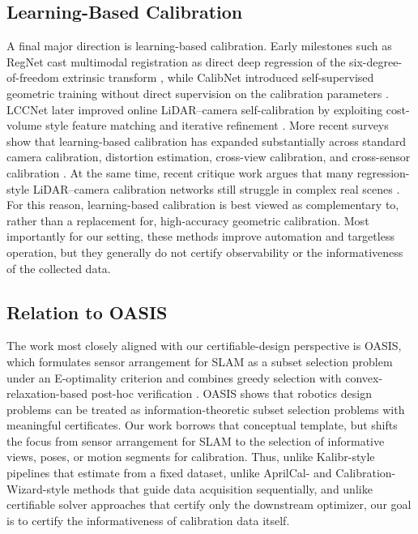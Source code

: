 \documentclass[11pt]{article}
\begin{document}
\subsection{Learning-Based Calibration}
A final major direction is learning-based calibration.
Early milestones such as RegNet cast multimodal registration as direct deep
regression of the six-degree-of-freedom extrinsic transform
\citep{schneider2017regnet}, while CalibNet introduced self-supervised
geometric training without direct supervision on the calibration parameters
\citep{iyer2018calibnet}.
LCCNet later improved online LiDAR--camera self-calibration by exploiting
cost-volume style feature matching and iterative refinement \citep{lv2021lccnet}.
More recent surveys show that learning-based calibration has expanded
substantially across standard camera calibration, distortion estimation,
cross-view calibration, and cross-sensor calibration \citep{liao2023survey}.
At the same time, recent critique work argues that many regression-style
LiDAR--camera calibration networks still struggle in complex real scenes
\citep{huang2025whatmatters}.
For this reason, learning-based calibration is best viewed as complementary
to, rather than a replacement for, high-accuracy geometric calibration.
Most importantly for our setting, these methods improve automation and
targetless operation, but they generally do not certify observability or
the informativeness of the collected data.

\subsection{Relation to OASIS}
The work most closely aligned with our certifiable-design perspective is
OASIS, which formulates sensor arrangement for SLAM as a subset selection
problem under an E-optimality criterion and combines greedy selection with
convex-relaxation-based post-hoc verification \citep{kaveti2023oasis}.
OASIS shows that robotics design problems can be treated as
information-theoretic subset selection problems with meaningful certificates.
Our work borrows that conceptual template, but shifts the focus from sensor
arrangement for SLAM to the selection of informative views, poses, or motion
segments for calibration.
Thus, unlike Kalibr-style pipelines that estimate from a fixed dataset,
unlike AprilCal- and Calibration-Wizard-style methods that guide data
acquisition sequentially, and unlike certifiable solver approaches that
certify only the downstream optimizer, our goal is to certify the
informativeness of calibration data itself.
\end{document}
